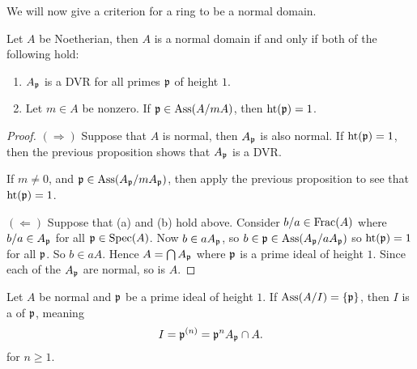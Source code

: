\documentclass{ximera}
\begin{document}
We will now give a criterion for a ring to be a normal domain.

\begin{theorem}
  Let $A$ be Noetherian, then $A$ is a normal domain if and only if
  both of the following hold:
  \begin{enumerate}
  \item $A_{\mathfrak{p}}$ is a DVR for all primes $\mathfrak{p}$ of height $1$.
  \item Let $m\in A$ be nonzero. If $\mathfrak{p} \in \operatorname{Ass}(A/mA)$, then $\operatorname{ht}(\mathfrak{p}) = 1$.
  \end{enumerate}
  \begin{proof}
    $(\Rightarrow)$ Suppose that $A$ is normal, then $A_{\mathfrak{p}}$ is also
    normal. If $\operatorname{ht}(\mathfrak{p}) = 1$, then the previous proposition shows that
    $A_{\mathfrak{p}}$ is a DVR.

    If $m\ne 0$, and $\mathfrak{p} \in \operatorname{Ass}(A_{\mathfrak{p}}/mA_{\mathfrak{p}})$, then apply the previous
    proposition to see that $\operatorname{ht}(\mathfrak{p}) = 1$.

    $(\Leftarrow)$ Suppose that (a) and (b) hold above. Consider
    $b/a\in\operatorname{Frac}(A)$ where $b/a\in A_{\mathfrak{p}}$ for all $\mathfrak{p}\in\operatorname{Spec}(A)$. Now
    $b\in a A_{\mathfrak{p}}$, so $b\in \mathfrak{p}\in \operatorname{Ass}(A_{\mathfrak{p}}/aA_{\mathfrak{p}})$ so $\operatorname{ht}(\mathfrak{p}) = 1$
    for all $\mathfrak{p}$.  So $b\in a A$. Hence $A = \bigcap A_{\mathfrak{p}}$ where $\mathfrak{p}$
    is a prime ideal of height $1$. Since each of the $A_{\mathfrak{p}}$ are
    normal, so is $A$.
  \end{proof}
\end{theorem}


\begin{corollary}
  Let $A$ be normal and $\mathfrak{p}$ be a prime ideal of height $1$. If
  $\operatorname{Ass}(A/I) = \{\mathfrak{p}\}$, then $I$ is a  of $\mathfrak{p}$,
  meaning
  \[
  I = \mathfrak{p}^{(n)} = \mathfrak{p}^n A_{\mathfrak{p}} \cap A.
  \]
  for  $n\ge 1$.
\end{corollary}







\end{document}
